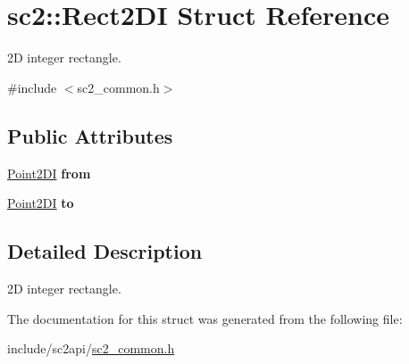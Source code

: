 \hypertarget{structsc2_1_1_rect2_d_i}{}\section{sc2\+:\+:Rect2\+DI Struct Reference}
\label{structsc2_1_1_rect2_d_i}


2D integer rectangle.  




{\ttfamily \#include $<$sc2\+\_\+common.\+h$>$}

\subsection*{Public Attributes}
\begin{DoxyCompactItemize}
\item 
\mbox{\label{structsc2_1_1_rect2_d_i_a758cf6e0af89f4f57284dc08450c314e}} 
\hyperlink{structsc2_1_1_point2_d_i}{Point2\+DI} {\bfseries from}
\item 
\mbox{\label{structsc2_1_1_rect2_d_i_a038a20a72e033c12c73bb02e779f737f}} 
\hyperlink{structsc2_1_1_point2_d_i}{Point2\+DI} {\bfseries to}
\end{DoxyCompactItemize}


\subsection{Detailed Description}
2D integer rectangle. 

The documentation for this struct was generated from the following file\+:\begin{DoxyCompactItemize}
\item 
include/sc2api/\hyperlink{sc2__common_8h}{sc2\+\_\+common.\+h}\end{DoxyCompactItemize}
